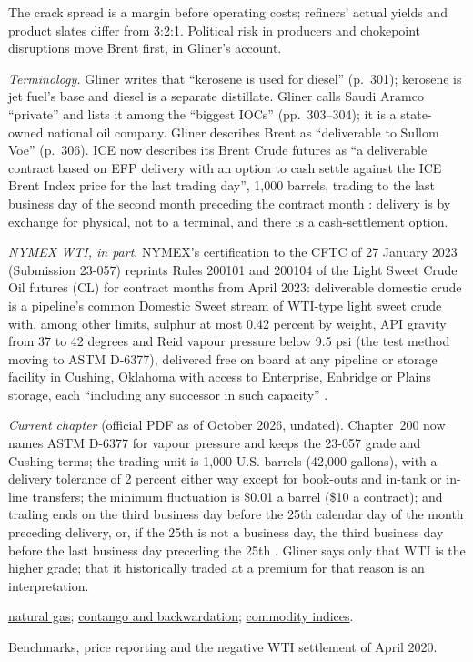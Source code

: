\begin{qfdefinition}
 The crack spread is a margin before operating costs; refiners' actual yields and product slates differ from 3:2:1. Political risk in producers and chokepoint disruptions move Brent first, in Gliner's account.

 \emph{Terminology.} Gliner writes that ``kerosene is used for diesel'' (p.~301); kerosene is jet fuel's base and diesel is a separate distillate. Gliner calls Saudi Aramco ``private'' and lists it among the ``biggest IOCs'' (pp.~303--304); it is a state-owned national oil company. Gliner describes Brent as ``deliverable to Sullom Voe'' (p.~306). ICE now describes its Brent Crude futures as ``a deliverable contract based on EFP delivery with an option to cash settle against the ICE Brent Index price for the last trading day'', 1,000 barrels, trading to the last business day of the second month preceding the contract month \citep[contract specifications]{ice-brent-spec}: delivery is by exchange for physical, not to a terminal, and there is a cash-settlement option.

\emph{NYMEX WTI, in part}. NYMEX's certification to the CFTC of 27 January 2023 (Submission 23-057) reprints Rules 200101 and 200104 of the Light Sweet Crude Oil futures (CL) for contract months from April 2023: deliverable domestic crude is a pipeline's common Domestic Sweet stream of WTI-type light sweet crude with, among other limits, sulphur at most 0.42 percent by weight, API gravity from 37 to 42 degrees and Reid vapour pressure below 9.5 psi (the test method moving to ASTM D-6377), delivered free on board at any pipeline or storage facility in Cushing, Oklahoma with access to Enterprise, Enbridge or Plains storage, each ``including any successor in such capacity'' \citep[Exhibits A--B]{nymex-23-057}.

\emph{Current chapter} (official PDF as of October 2026, undated). Chapter~200 now names ASTM D-6377 for vapour pressure and keeps the 23-057 grade and Cushing terms; the trading unit is 1,000 U.S. barrels (42,000 gallons), with a delivery tolerance of 2 percent either way except for book-outs and in-tank or in-line transfers; the minimum fluctuation is \$0.01 a barrel (\$10 a contract); and trading ends on the third business day before the 25th calendar day of the month preceding delivery, or, if the 25th is not a business day, the third business day before the last business day preceding the 25th \citep[Rules 200101 and 200102.B--F]{nymex-ch200-2026}. Gliner says only that WTI is the higher grade; that it historically traded at a premium for that reason is an interpretation.

 \hyperref[def:natural-gas-market]{natural gas}; \hyperref[def:contango-backwardation-stocks]{contango and backwardation}; \hyperref[def:commodity-indices-risk-return]{commodity indices}.

 Benchmarks, price reporting and the negative WTI settlement of April 2020.

\end{qfdefinition}

